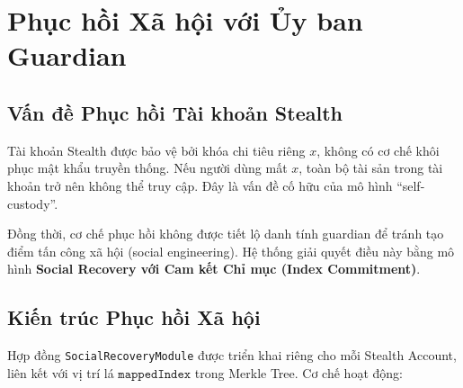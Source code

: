 \documentclass[../DoAn.tex]{subfiles}
\begin{document}
\section{Phục hồi Xã hội với Ủy ban Guardian}

\subsection{Vấn đề Phục hồi Tài khoản Stealth}
\label{subsec:recovery_problem}

Tài khoản Stealth được bảo vệ bởi khóa chi tiêu riêng \(x\), không có cơ chế khôi phục mật khẩu truyền thống. Nếu người dùng mất \(x\), toàn bộ tài sản trong tài khoản trở nên không thể truy cập. Đây là vấn đề cố hữu của mô hình ``self-custody''.

Đồng thời, cơ chế phục hồi không được tiết lộ danh tính guardian để tránh tạo điểm tấn công xã hội (social engineering). Hệ thống giải quyết điều này bằng mô hình \textbf{Social Recovery với Cam kết Chỉ mục (Index Commitment)}.

\subsection{Kiến trúc Phục hồi Xã hội}
\label{subsec:social_recovery}

Hợp đồng \texttt{SocialRecoveryModule} được triển khai riêng cho mỗi Stealth Account, liên kết với vị trí lá \(\texttt{mappedIndex}\) trong Merkle Tree. Cơ chế hoạt động:
\end{document}
